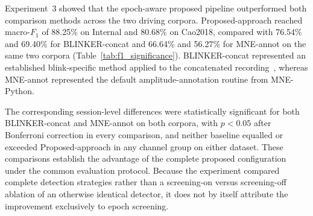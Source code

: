 Experiment~3 showed that the epoch-aware proposed pipeline outperformed both comparison methods across the two driving corpora. Proposed-approach reached macro-$F_1$ of 88.25\% on Internal and 80.68\% on Cao2018, compared with 76.54\% and 69.40\% for BLINKER-concat and 66.64\% and 56.27\% for MNE-annot on the same two corpora (Table~\ref{tab:f1_significance}). BLINKER-concat represented an established blink-specific method applied to the concatenated recording~\citep{kleifges2017blinker}, whereas MNE-annot represented the default amplitude-annotation routine from MNE-Python.

The corresponding session-level differences were statistically significant for both BLINKER-concat and MNE-annot on both corpora, with $p<0.05$ after Bonferroni correction in every comparison, and neither baseline equalled or exceeded Proposed-approach in any channel group on either dataset. These comparisons establish the advantage of the complete proposed configuration under the common evaluation protocol. Because the experiment compared complete detection strategies rather than a screening-on versus screening-off ablation of an otherwise identical detector, it does not by itself attribute the improvement exclusively to epoch screening.
